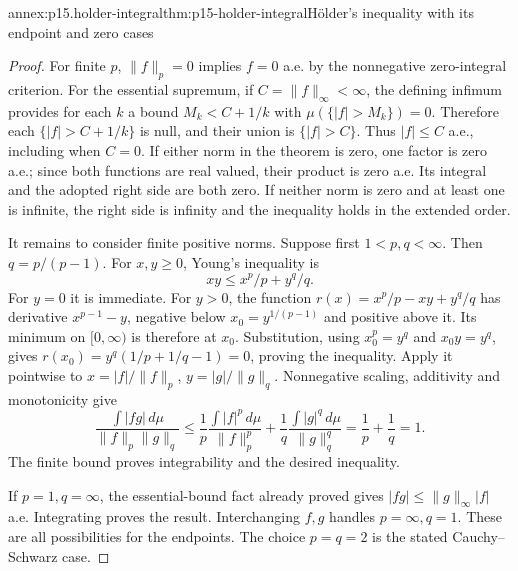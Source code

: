 \begin{annexitem}{annex:p15.holder-integral}{thm:p15-holder-integral}{H\"older's inequality with its endpoint and zero cases}
\begin{proof}
For finite \(p\), \(\|f\|_p=0\) implies \(f=0\) a.e. by
the nonnegative zero-integral criterion. For the essential supremum,
if \(C=\|f\|_\infty<\infty\), the defining infimum provides
for each \(k\) a bound \(M_k<C+1/k\) with
\(\mu(\{|f|>M_k\})=0\). Therefore each
\(\{|f|>C+1/k\}\) is null, and their union is
\(\{|f|>C\}\). Thus \(|f|\leq C\) a.e., including when
\(C=0\). If either norm in the theorem is zero, one factor is
zero a.e.; since both functions are real valued, their product is
zero a.e. Its integral and the adopted right side are both zero.
If neither norm is zero and at least one is infinite, the right side
is infinity and the inequality holds in the extended order.

It remains to consider finite positive norms. Suppose first
\(1<p,q<\infty\). Then \(q=p/(p-1)\). For \(x,y\geq0\),
Young's inequality is
\[
 xy\leq x^p/p+y^q/q.
\]
For \(y=0\) it is immediate. For \(y>0\), the function
\(r(x)=x^p/p-xy+y^q/q\) has derivative \(x^{p-1}-y\),
negative below \(x_0=y^{1/(p-1)}\) and positive above it.
Its minimum on \([0,\infty)\) is therefore at \(x_0\).
Substitution, using \(x_0^p=y^q\) and \(x_0y=y^q\), gives
\(r(x_0)=y^q(1/p+1/q-1)=0\), proving the inequality.
Apply it pointwise to
\(x=|f|/\|f\|_p\), \(y=|g|/\|g\|_q\).
Nonnegative scaling, additivity and monotonicity give
\[
 \frac{\int|fg|\,d\mu}{\|f\|_p\|g\|_q}
  \leq\frac1p\frac{\int|f|^p\,d\mu}{\|f\|_p^p}
      +\frac1q\frac{\int|g|^q\,d\mu}{\|g\|_q^q}
  =\frac1p+\frac1q=1.
\]
The finite bound proves integrability and the desired inequality.

If \(p=1,q=\infty\), the essential-bound fact already proved
gives \(|fg|\leq\|g\|_\infty|f|\) a.e. Integrating proves
the result. Interchanging \(f,g\) handles \(p=\infty,q=1\).
These are all possibilities for the endpoints. The choice \(p=q=2\)
is the stated Cauchy--Schwarz case.
\end{proof}
\end{annexitem}

